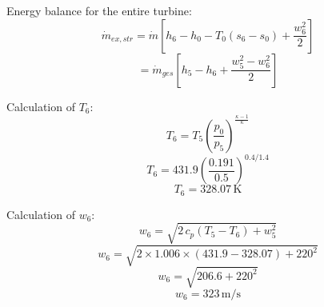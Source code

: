 Energy balance for the entire turbine:  
\[
\dot{m}_{ex,str} = \dot{m} \left[ h_6 - h_0 - T_0 (s_6 - s_0) + \frac{w_6^2}{2} \right]
\]  
\[
= \dot{m}_{ges} \left[ h_5 - h_6 + \frac{w_5^2 - w_6^2}{2} \right]
\]  

Calculation of \( T_6 \):  
\[
T_6 = T_5 \left( \frac{p_0}{p_5} \right)^{\frac{\kappa - 1}{\kappa}}
\]  
\[
T_6 = 431.9 \left( \frac{0.191}{0.5} \right)^{0.4 / 1.4}
\]  
\[
T_6 = 328.07 \, \text{K}
\]  

Calculation of \( w_6 \):  
\[
w_6 = \sqrt{2 \, c_p (T_5 - T_6) + w_5^2}
\]  
\[
w_6 = \sqrt{2 \times 1.006 \times (431.9 - 328.07) + 220^2}
\]  
\[
w_6 = \sqrt{206.6 + 220^2}
\]  
\[
w_6 = 323 \, \text{m/s}
\]
